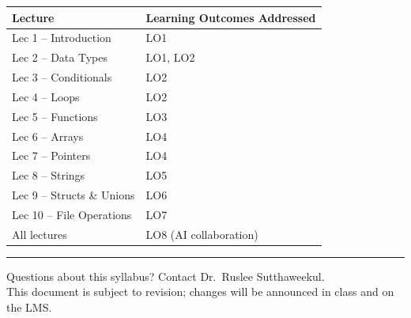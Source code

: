 \documentclass[11pt,a4paper]{article}
\begin{document}
\begin{tabularx}{\textwidth}{@{}lX@{}}
  \toprule
  \textbf{Lecture} & \textbf{Learning Outcomes Addressed} \\
  \midrule
  Lec 1 -- Introduction       & LO1 \\
  Lec 2 -- Data Types         & LO1, LO2 \\
  Lec 3 -- Conditionals       & LO2 \\
  Lec 4 -- Loops              & LO2 \\
  Lec 5 -- Functions          & LO3 \\
  Lec 6 -- Arrays             & LO4 \\
  Lec 7 -- Pointers           & LO4 \\
  Lec 8 -- Strings            & LO5 \\
  Lec 9 -- Structs \& Unions  & LO6 \\
  Lec 10 -- File Operations   & LO7 \\
  All lectures                & LO8 (AI collaboration) \\
  \bottomrule
\end{tabularx}

\vspace{20pt}
\noindent\rule{\textwidth}{0.4pt}
\begin{center}
  {\small\color{muted}
    Questions about this syllabus? Contact Dr.\ Ruslee Sutthaweekul.\\
    This document is subject to revision; changes will be announced in class and on the LMS.
  }
\end{center}
\end{document}
